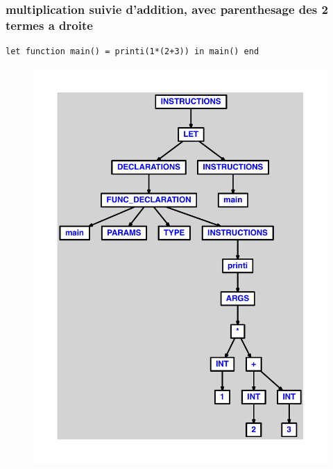 \documentclass{article}
\begin{document}
\subsubsection{multiplication suivie d'addition, avec parenthesage des 2 termes a droite}
\begin{lstlisting}
let function main() = printi(1*(2+3)) in main() end
\end{lstlisting}
\newpage
\begin{figure}[H]
\centering
\includegraphics[max width=\textwidth]{ast/ast_91.pdf}
\end{figure}
\newpage
\end{document}
